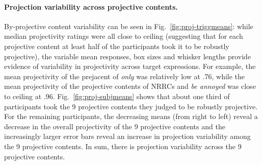 \documentclass[11pt,fleqn]{article}
\newcommand{\6}{\mbox{$[\hspace*{-.6mm}[$}}
\newcommand{\9}{\mbox{$]\hspace*{-.6mm}]$}}
\newcommand{\figref}[1]{Fig.~\ref{#1}}
\begin{document}
\paragraph{Projection variability across projective contents.} By-projective content variability can be seen in \figref{fig:proj-triggmeans}:  while median projectivity ratings were all close to ceiling (suggesting that for each projective content at least half of the participants took it to be robustly projective), the variable mean responses, box sizes and whisker lengths provide evidence of variability in projectivity across target expressions. For example, the mean projectivity of the prejacent of \emph{only} was relatively low at .76, while the mean projectivity of the projective contents of NRRCs and \emph{be annoyed} was close to ceiling at .96. \figref{fig:proj-subjmeans} shows that about one third of participants took the 9 projective contents they judged to be robustly projective. For the remaining participants, the decreasing means (from right to left) reveal a decrease in the overall projectivity of the 9 projective contents and the increasingly larger error bars reveal an increase in projection variability among the 9 projective contents. In sum, there is projection variability across the 9 projective contents.
\end{document}
